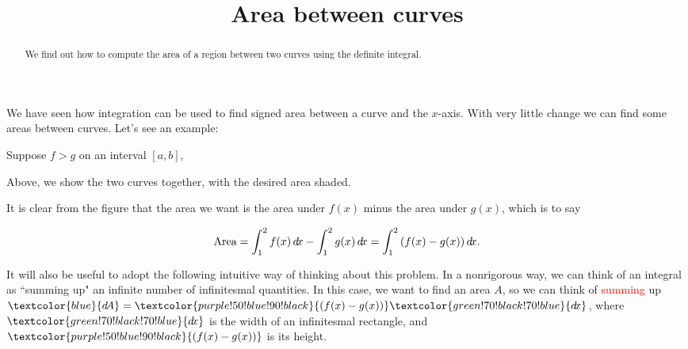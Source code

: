\documentclass{ximera}
\title[Dig-In:]{Area between curves}
\begin{document}
\begin{abstract}
  We find out how to compute the area of a region between two curves using the definite integral.
\end{abstract}
\maketitle


We have seen how integration can be used to find signed area between a
curve and the $x$-axis. With very little change we can find some areas
between curves. Let's see an example:


\begin{explanation}
Suppose $f>g$ on an interval $[a,b]$,

\begin{image}
\end{image}


Above, we show the two curves together, with the desired area shaded.

It is clear from the figure that the area we want is the area under
$f(x)$ minus the area under $g(x)$, which is to say

\[
\textrm{Area} = \int_1^2 f(x)\mathop{}\!d\! x-\int_1^2 g(x)\mathop{}\!d\! x = \int_1^2 \left(f(x)-g(x)\right)\mathop{}\!d\! x.
\]

It will also be useful to adopt the following intuitive way of thinking about this problem. In a nonrigorous way, we can think of an integral as ``summing up" an infinite number of infinitesmal quantities.  In this case, we want to find an area $A$, so we can think of \textcolor{red}{summing} up $\textcolor{blue}{\d A} = \textcolor{purple!50!blue!90!black}{(f(x) - g(x))} \textcolor{green!70!black!70!blue}{ \d x}$, where $\textcolor{green!70!black!70!blue}{ \d x}$ is the width of an infinitesmal rectangle, and $\textcolor{purple!50!blue!90!black}{(f(x) - g(x))}$ is its height.


\end{explanation}
\end{document}
